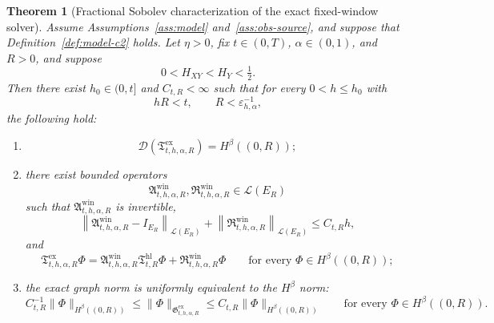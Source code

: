 \documentclass[11pt,a4paper]{amsart}
\theoremstyle{plain}
\newtheorem{theorem}{Theorem}[section]
\theoremstyle{definition}
\theoremstyle{remark}
\begin{document}
\begin{theorem}[Fractional Sobolev characterization of the exact fixed-window solver]
\label{thm:micro-window-regularity}
Assume Assumptions~\ref{ass:model} and~\ref{ass:obs-source}, and suppose that
Definition~\ref{def:model-c2} holds. Let \(\eta>0\), fix \(t\in(0,T)\), \(\alpha\in(0,1)\), and
\(R>0\), and suppose
\[
0<H_{XY}<H_Y<\tfrac12.
\]
Then there exist \(h_0\in(0,t]\) and \(C_{t,R}<\infty\) such that for every \(0<h\le h_0\) with
\[
hR<t,
\qquad
R<\varepsilon_{h,\alpha}^{-1},
\]
the following hold:
\begin{enumerate}[label=(\roman*)]
\item
\begin{equation}\label{eq:window-domain-regularity}
\mathcal D(\mathfrak T_{t,h,\alpha,R}^{\mathrm{ex}})
=
H^\beta((0,R));
\end{equation}
\item there exist bounded operators
\[
\mathfrak A_{t,h,\alpha,R}^{\mathrm{win}},
\mathfrak R_{t,h,\alpha,R}^{\mathrm{win}}
\in \mathcal L(E_R)
\]
such that \(\mathfrak A_{t,h,\alpha,R}^{\mathrm{win}}\) is invertible,
\begin{equation}\label{eq:window-A-close}
\left\|
\mathfrak A_{t,h,\alpha,R}^{\mathrm{win}}-I_{E_R}
\right\|_{\mathcal L(E_R)}
+
\left\|
\mathfrak R_{t,h,\alpha,R}^{\mathrm{win}}
\right\|_{\mathcal L(E_R)}
\le
C_{t,R}h,
\end{equation}
and
\begin{equation}\label{eq:window-solver-representation}
\mathfrak T_{t,h,\alpha,R}^{\mathrm{ex}}\Phi
=
\mathfrak A_{t,h,\alpha,R}^{\mathrm{win}}
\mathfrak T_{t,R}^{\mathrm{hl}}\Phi
+
\mathfrak R_{t,h,\alpha,R}^{\mathrm{win}}\Phi
\qquad
\text{for every }\Phi\in H^\beta((0,R));
\end{equation}
\item the exact graph norm is uniformly equivalent to the \(H^\beta\) norm:
\begin{equation}\label{eq:window-graph-equivalence}
C_{t,R}^{-1}\|\Phi\|_{H^\beta((0,R))}
\le
\|\Phi\|_{\mathfrak G_{t,h,\alpha,R}^{\mathrm{ex}}}
\le
C_{t,R}\|\Phi\|_{H^\beta((0,R))}
\qquad
\text{for every }\Phi\in H^\beta((0,R)).
\end{equation}
\end{enumerate}
\end{theorem}
\end{document}
